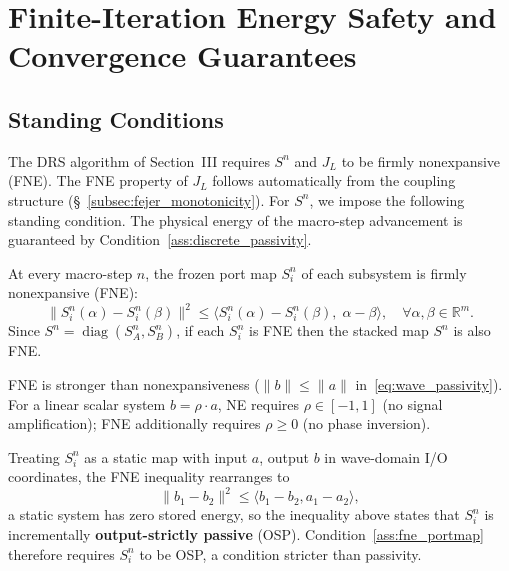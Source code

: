 \section{Finite-Iteration Energy Safety and Convergence Guarantees}
\label{sec:passivity_convergence}

\subsection{Standing Conditions}
\label{subsec:standing_conditions}

The DRS algorithm of Section~III requires $S^n$ and $J_L$ to be firmly nonexpansive (FNE). The FNE property of $J_L$ follows automatically from the coupling structure (\S~\ref{subsec:fejer_monotonicity}). For $S^n$, we impose the following standing condition. The physical energy of the macro-step advancement is guaranteed by Condition~\ref{ass:discrete_passivity}.

\begin{condition}
\label{ass:fne_portmap}
At every macro-step $n$, the frozen port map $S_i^n$ of each subsystem is firmly nonexpansive (FNE):
\begin{equation}
\|S_i^n(\alpha) - S_i^n(\beta)\|^2 \leq \big\langle S_i^n(\alpha) - S_i^n(\beta),\; \alpha - \beta \big\rangle, \quad \forall \alpha, \beta \in \mathbb{R}^m.
\label{eq:fne_inequality}
\end{equation}
Since $S^n = \operatorname{diag}(S_A^n, S_B^n)$, if each $S_i^n$ is FNE then the stacked map $S^n$ is also FNE.
\end{condition}

FNE is stronger than nonexpansiveness ($\|b\| \leq \|a\|$ in~\eqref{eq:wave_passivity}). For a linear scalar system $b = \rho \cdot a$, NE requires $\rho \in [-1, 1]$ (no signal amplification); FNE additionally requires $\rho \geq 0$ (no phase inversion).

Treating $S_i^n$ as a static map with input $a$, output $b$ in wave-domain I/O coordinates, the FNE inequality rearranges to
\begin{equation}
\|b_1 - b_2\|^2 \leq \langle b_1 - b_2, a_1 - a_2\rangle,
\label{eq:fne_rearranged}
\end{equation}
a static system has zero stored energy, so the inequality above states that $S_i^n$ is incrementally \textbf{output-strictly passive} (OSP). Condition~\ref{ass:fne_portmap} therefore requires $S_i^n$ to be OSP, a condition stricter than passivity.

